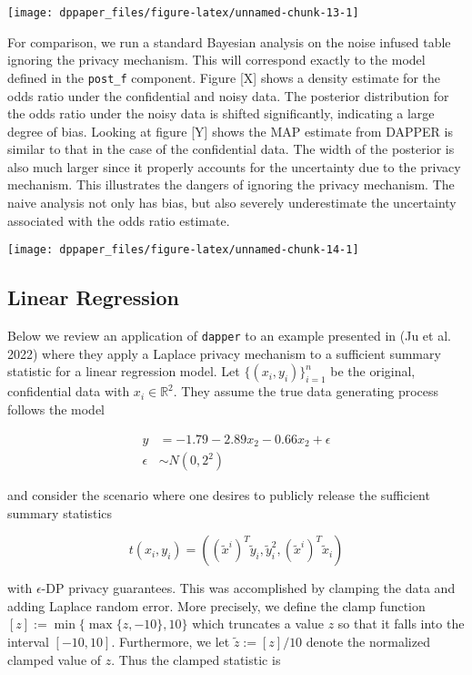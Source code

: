 \begin{center}\texttt{[image: dppaper\_files/figure-latex/unnamed-chunk-13-1]} \end{center}

For comparison, we run a standard Bayesian analysis on the
noise infused table ignoring the privacy mechanism. This will
correspond exactly to the model defined in the \texttt{post\_f} component.
Figure {[}X{]} shows a density estimate for the odds ratio
under the confidential and noisy data. The posterior
distribution for the odds ratio under the noisy data
is shifted significantly, indicating a large degree of bias.
Looking at figure {[}Y{]} shows the MAP estimate from DAPPER
is similar to that in the case of the confidential data.
The width of the posterior is also much larger since
it properly accounts for the uncertainty due to the privacy mechanism. This
illustrates the dangers of ignoring the privacy mechanism. The naive
analysis not only has bias, but also severely underestimate the
uncertainty associated with the odds ratio estimate.

\begin{center}\texttt{[image: dppaper\_files/figure-latex/unnamed-chunk-14-1]} \end{center}

\hypertarget{linear-regression}{%
\subsection{Linear Regression}\label{linear-regression}}

Below we review an application of \texttt{dapper} to an example
presented in (Ju et al. 2022) where they apply a Laplace privacy
mechanism to a sufficient summary statistic for a linear regression model.
Let \(\{(x_i,y_i)\}_{i=1}^{n}\) be the original, confidential data with \(x_i \in \mathbb{R}^2\).
They assume the true data generating process follows the model

\[
\begin{aligned}
y &= -1.79 -2.89x_2 -0.66x_2 + \epsilon\\
\epsilon &\sim N(0,2^2)
\end{aligned}
\]

and consider the scenario where one desires to publicly release the
sufficient summary statistics

\[
t(x_i,y_i) = ((\tilde{x}^{i})^T \tilde{y}_i, \tilde{y}_i^2, (\tilde{x}^{i})^T \tilde{x}_i)
\]

with \(\epsilon\)-DP privacy guarantees. This was accomplished
by clamping the data and adding Laplace random error. More precisely, we define
the clamp function \([z] := \min\{\max\{z,-10\}, 10\}\) which truncates a value
\(z\) so that it falls into the interval \([-10,10]\). Furthermore, we let \(\tilde{z} := [z]/10\)
denote the normalized clamped value of \(z\). Thus the clamped statistic is

